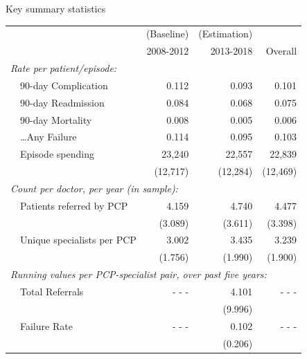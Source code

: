 \documentclass[slides, aspectratio=169]{beamer}
\begin{document}
\begin{frame}{Key summary statistics} %
\label{sumstats}
\scriptsize
\centering

\begin{tabular}{llrrr}
\hline
&    & (Baseline)     & (Estimation) \\
&    & 2008-2012     & 2013-2018 & Overall\\
\hline
\multicolumn{4}{l}{\emph{Rate per patient/episode:}}    \\
& 90-day Complication &       0.112&       0.093&       0.101\\
& 90-day Readmission  &       0.084&       0.068&       0.075\\
& 90-day Mortality    &       0.008&       0.005&       0.006\\
& {\dots}Any Failure  &       0.114&       0.095&       0.103\\[6pt]
& Episode spending    &      23,240&      22,557&      22,839\\
&                     &    (12,717)&    (12,284)&     (12,469)\\[6pt]
\multicolumn{5}{l}{\emph{Count per doctor, per year (in sample):}}    \\
& Patients referred by PCP    &       4.159&       4.740&       4.477\\
&                     &     (3.089)&     (3.611)&     (3.398)\\
& Unique specialists per PCP  &       3.002&       3.435&       3.239\\
&                     &     (1.756)&     (1.990)&     (1.900)\\[6pt]
\multicolumn{5}{l}{\emph{Running values per PCP-specialist pair, over past five years:}}    \\
& Total Referrals     & - - -    &        4.101 & - - - \\
&                     &          &       (9.996) \\
& Failure Rate        & - - -    &       0.102  & - - - \\
&                     &          &      (0.206) \\
\hline
\end{tabular}

\end{frame}
\end{document}
